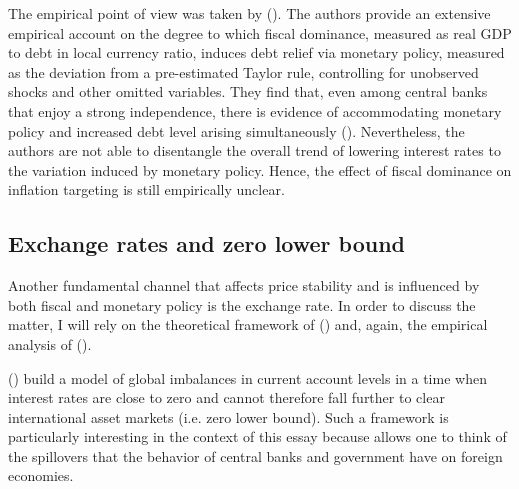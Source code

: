 \documentclass[american]{scrartcl}
\newcommand{\citein}[1]{\citeauthor{#1} (\citeyear{#1})}
\begin{document}
The empirical point of view was taken by \citein{Ahmed2021}. The authors provide an extensive empirical account on the degree to which fiscal dominance, measured as real GDP to debt in local currency ratio, induces debt relief via monetary policy, measured as the deviation from a pre-estimated Taylor rule, controlling for unobserved shocks and other omitted variables. They find that, even among central banks that enjoy a strong independence, there is evidence of accommodating monetary policy and increased debt level arising simultaneously (\cite[p. 19]{Ahmed2021}). Nevertheless, the authors are not able to disentangle the overall trend of lowering interest rates to the variation induced by monetary policy. Hence, the effect of fiscal dominance on inflation targeting is still empirically unclear.

\subsection{Exchange rates and zero lower bound}

Another fundamental channel that affects price stability and is influenced by both fiscal and monetary policy is the exchange rate. In order to discuss the matter, I will rely on the theoretical framework of \citein{Caballero2016} and, again, the empirical analysis of \citein{Ahmed2021}.

\citein{Caballero2016} build a model of global imbalances in current account levels in a time when interest rates are close to zero and cannot therefore fall further to clear international asset markets (i.e. zero lower bound). Such a framework is particularly interesting in the context of this essay because allows one to think of the spillovers that the behavior of central banks and government have on foreign economies.
\end{document}
